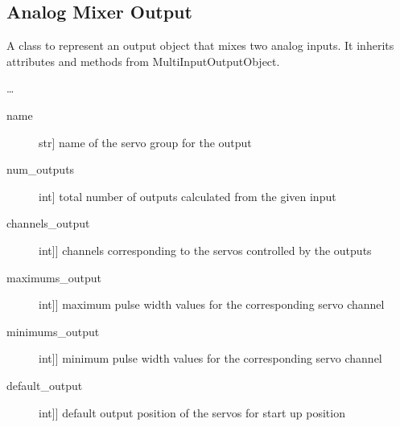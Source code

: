 \documentclass[letterpaper,10pt,english]{sphinxmanual}
\begin{document}
\subsection{Analog Mixer Output}
\label{\detokenize{generic:module-AnalogMixerOutput}}\label{\detokenize{generic:analog-mixer-output}}

\begin{fulllineitems}
\label{\detokenize{generic:AnalogMixerOutput.AnalogMixerOutput}}
\sphinxAtStartPar
A class to represent an output object that mixes two analog inputs.
It inherits attributes and methods from MultiInputOutputObject.

\sphinxAtStartPar
…

\sphinxAtStartPar
{}
\begin{description}
\item[{name}] \leavevmode{[}str{]}
\sphinxAtStartPar
name of the servo group for the output

\item[{num\_outputs}] \leavevmode{[}int{]}
\sphinxAtStartPar
total number of outputs calculated from the given input

\item[{channels\_output}] \leavevmode{[}{[}int{]}{]}
\sphinxAtStartPar
channels corresponding to the servos controlled by the outputs

\item[{maximums\_output}] \leavevmode{[}{[}int{]}{]}
\sphinxAtStartPar
maximum pulse width values for the corresponding servo channel

\item[{minimums\_output}] \leavevmode{[}{[}int{]}{]}
\sphinxAtStartPar
minimum pulse width values for the corresponding servo channel

\item[{default\_output}] \leavevmode{[}{[}int{]}{]}
\sphinxAtStartPar
default output position of the servos for start up position


\end{description}
\end{fulllineitems}
\end{document}
